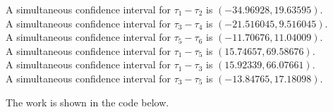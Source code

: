\documentclass[12pt,]{article}
\begin{document}
\begin{center}
A simultaneous confidence interval for $\tau_1 -\tau_2$ is $(-34.96928,19.63595)$.\\
A simultaneous confidence interval for $\tau_3 -\tau_4$ is $(-21.516045,9.516045)$.\\
A simultaneous confidence interval for $\tau_5 -\tau_6$ is $(-11.70676,11.04009)$.\\
A simultaneous confidence interval for $\tau_1 -\tau_5$ is $(15.74657,69.58676)$.\\
A simultaneous confidence interval for $\tau_1 -\tau_3$ is $(15.92339,66.07661)$.\\
A simultaneous confidence interval for $\tau_3 -\tau_5$ is $(-13.84765,17.18098)$.
\end{center}

The work is shown in the code below.
\end{document}

